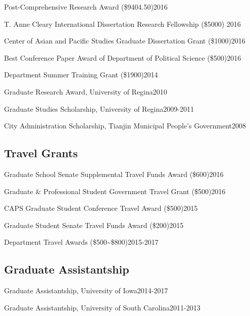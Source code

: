 \documentclass[10.5pt,]{article}
\providecommand{\tightlist}{%
  \setlength{\itemsep}{0pt}\setlength{\parskip}{0pt}}
\renewenvironment{itemize}{
  \begin{list}{}{
    \setlength{\leftmargin}{1.5em}
  }
}{
  \end{list}
}
\begin{document}
\begin{itemize}
\tightlist
\item
  Post-Comprehensive Research Award (\$9404.50)\hfill 2016
\item
  T. Anne Cleary International Dissertation Research Fellowship (\$5000)
  \hfill 2016
\item
  Center of Asian and Pacific Studies Graduate Dissertation Grant
  (\$1000)\hfill 2016
\item
  Best Conference Paper Award of Department of Political Science
  (\$500)\hfill 2016
\item
  Department Summer Training Grant (\$1900)\hfill 2014
\item
  Graduate Research Award, University of Regina\hfill 2010
\item
  Graduate Studies Scholarship, University of Regina\hfill 2009-2011
\item
  City Administration Scholarship, Tianjin Municipal People's
  Government\hfill 2008
\end{itemize}

\subsection{Travel Grants}\label{travel-grants}

\begin{itemize}
\tightlist
\item
  Graduate School Senate Supplemental Travel Funds Award
  (\$600)\hfill 2016
\item
  Graduate \& Professional Student Government Travel Grant
  (\$500)\hfill 2016
\item
  CAPS Graduate Student Conference Travel Award (\$500)\hfill 2015
\item
  Graduate Student Senate Travel Funds Award (\$200)\hfill 2015
\item
  Department Travel Awards (\$500\textasciitilde{}\$800)\hfill 2015-2017
\end{itemize}

\subsection{Graduate Assistantship}\label{graduate-assistantship}

\begin{itemize}
\tightlist
\item
  Graduate Assistantship, University of Iowa\hfill 2014-2017
\item
  Graduate Assistantship, University of South Carolina\hfill 2011-2013
\end{itemize}
\end{document}

